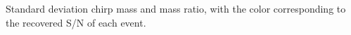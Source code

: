 \label{fig:mass_std_snr} Standard deviation chirp mass and mass ratio, with the color corresponding to the recovered S/N of each event.